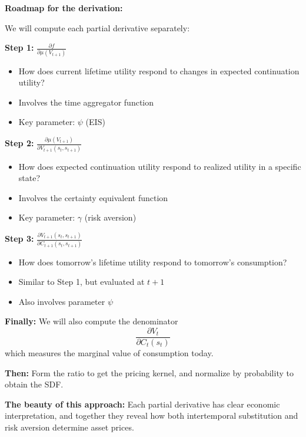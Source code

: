 \documentclass{beamer}
\begin{document}
\begin{frame}[allowframebreaks]
    \framebreak
    
    \textbf{Roadmap for the derivation:}
    
    We will compute each partial derivative separately:
    
    \textbf{Step 1:} $\frac{\partial f}{\partial \mu(V_{t+1})}$
    \begin{itemize}
        \item How does current lifetime utility respond to changes in expected continuation utility?
        \item Involves the time aggregator function
        \item Key parameter: $\psi$ (EIS)
    \end{itemize}
    
    \textbf{Step 2:} $\frac{\partial \mu(V_{t+1})}{\partial V_{t+1}(s_t, s_{t+1})}$
    \begin{itemize}
        \item How does expected continuation utility respond to realized utility in a specific state?
        \item Involves the certainty equivalent function
        \item Key parameter: $\gamma$ (risk aversion)
    \end{itemize}
    
    \textbf{Step 3:} $\frac{\partial V_{t+1}(s_t, s_{t+1})}{\partial C_{t+1}(s_t, s_{t+1})}$
    \begin{itemize}
        \item How does tomorrow's lifetime utility respond to tomorrow's consumption?
        \item Similar to Step 1, but evaluated at $t+1$
        \item Also involves parameter $\psi$
    \end{itemize}
    
    \framebreak
    
    \textbf{Finally:} We will also compute the denominator
    \begin{equation*}
        \frac{\partial V_t}{\partial C_t(s_t)}
    \end{equation*}
    which measures the marginal value of consumption today.
    
    \textbf{Then:} Form the ratio to get the pricing kernel, and normalize by probability to obtain the SDF.
    
    \textbf{The beauty of this approach:} Each partial derivative has clear economic interpretation, and together they reveal how both intertemporal substitution and risk aversion determine asset prices.
\end{frame}
\end{document}
